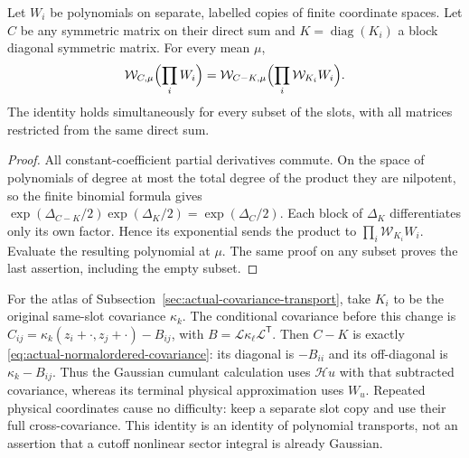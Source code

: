 \begin{lemma}
\label{lem:rank-raw-wick-identity}
Let $W_i$ be polynomials on separate, labelled copies of finite coordinate
spaces. Let $C$ be any symmetric matrix on their direct sum and
$K=\operatorname{diag}(K_i)$ a block diagonal symmetric matrix. For every
mean $\mu$,
\[
 \mathcal W_{C,\mu}\Bigl(\prod_iW_i\Bigr)
 =\mathcal W_{C-K,\mu}\Bigl(\prod_i\mathcal W_{K_i}W_i\Bigr).
\]
The identity holds simultaneously for every subset of the slots, with
all matrices restricted from the same direct sum.
\end{lemma}
\begin{proof}
All constant-coefficient partial derivatives commute. On the space of
polynomials of degree at most the total degree of the product they are
nilpotent, so the finite binomial formula gives
$\exp(\Delta_{C-K}/2)\exp(\Delta_K/2)=\exp(\Delta_C/2)$.
Each block of $\Delta_K$ differentiates only its own factor. Hence its
exponential sends the product to $\prod_i\mathcal W_{K_i}W_i$.
Evaluate the resulting polynomial at $\mu$. The same proof on any
subset proves the last assertion, including the empty subset.
\end{proof}

For the atlas of Subsection~\ref{sec:actual-covariance-transport}, take
$K_i$ to be the original same-slot covariance $\kappa_k$.
The conditional covariance before this change is
$C_{ij}=\kappa_k(z_i+\cdot,z_j+\cdot)-B_{ij}$, with
$B=\mathcal L\kappa_\ell\mathcal L^{\mathsf T}$.
Then $C-K$ is exactly \eqref{eq:actual-normalordered-covariance}:
its diagonal is $-B_{ii}$ and its off-diagonal is $\kappa_k-B_{ij}$.
Thus the Gaussian cumulant calculation uses $\mathcal H u$ with that
subtracted covariance, whereas its terminal physical approximation uses
$W_u$. Repeated physical coordinates cause no difficulty: keep a separate
slot copy and use their full cross-covariance. This identity is an identity
of polynomial transports, not an assertion that a cutoff nonlinear
sector integral is already Gaussian.

